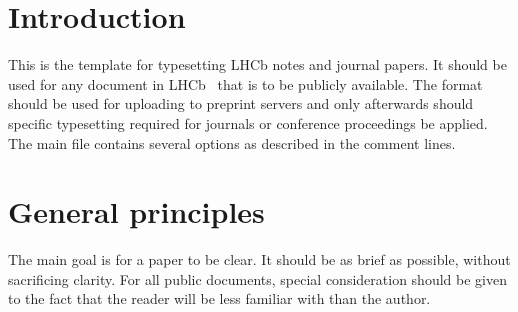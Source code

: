 \section{Introduction}
\label{sec:Introduction}
 
This is the template for typesetting LHCb notes and journal papers.
It should be used for any document in LHCb~\cite{LHCb-DP-2008-001} that is to be
publicly available. The format should be used for uploading to
preprint servers and only afterwards should specific typesetting
required for journals or conference proceedings be applied. The main
\latex file contains several options as described in the \latex comment
lines.

\section{General principles}

The main goal is for a paper to be clear. It should be as brief as
possible, without sacrificing clarity. For all public documents,
special consideration should be given to the fact that the reader will
be less familiar with \lhcb than the author.

